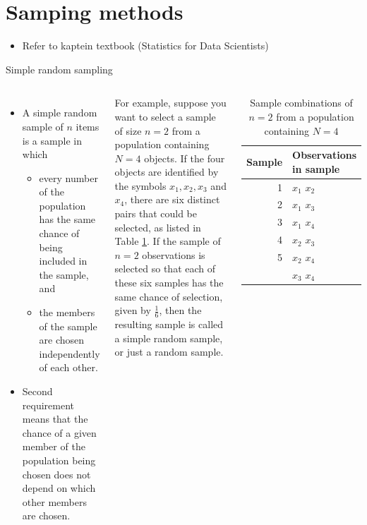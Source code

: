 \documentclass[
  ignorenonframetext,
  aspectratio=169]{beamer}
\providecommand{\tightlist}{%
  \setlength{\itemsep}{0pt}\setlength{\parskip}{0pt}}
\begin{document}
\hypertarget{samping-methods}{%
\section{Samping methods}\label{samping-methods}}

\begin{frame}{}
\protect\hypertarget{section-7}{}
\begin{itemize}
\tightlist
\item
  Refer to kaptein textbook (Statistics for Data Scientists)
\end{itemize}
\end{frame}

\begin{frame}{Simple random sampling}
\protect\hypertarget{simple-random-sampling}{}
\begin{columns}[T,onlytextwidth]
\begin{itemize}
\small
\item A simple random sample of $n$ items is a sample in which 
  \begin{itemize}
  \small
  \item every number of the population has the same chance of being included in the sample, and 
  \item the members of the sample are chosen independently of each other.
  \end{itemize}
\item Second requirement means that the chance of a given member of the population being chosen does not depend on which other members are chosen.
\end{itemize}

\footnotesize
For example, suppose you want to select a sample of size $n = 2$ from a population containing $N = 4$ objects. If the four objects are identified by the symbols $x_1, x_2, x_3$ and $x_4$, there are six distinct pairs that could be selected, as listed in Table \ref{tab:srs-sample-space}. If the sample of $n = 2$ observations is selected so that each of these six samples has the same chance of selection, given by $\frac{1}{6}$, then the resulting sample is called a simple random sample, or just a random sample.


\begin{table}

\caption{\label{tab:srs-sample-space}Sample combinations of $n=2$ from a population containing $N=4$}
\centering
\fontsize{7}{9}\selectfont
\begin{tabular}[t]{rl}
\toprule
Sample & Observations in sample\\
\midrule
1 & $x_1$ $x_2$\\
2 & $x_1$ $x_3$\\
3 & $x_1$ $x_4$\\
4 & $x_2$ $x_3$\\
5 & $x_2$ $x_4$\\
\addlinespace
6 & $x_3$ $x_4$\\
\bottomrule
\end{tabular}
\end{table}


\end{columns}
\end{frame}
\end{document}
